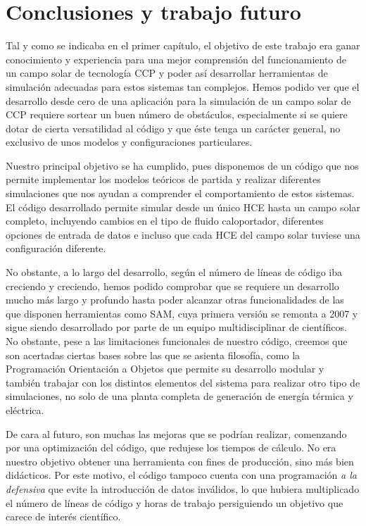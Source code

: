 \chapter{Conclusiones y trabajo futuro}
\label{conclusiones}

Tal y como se indicaba en el primer capítulo, el objetivo de este trabajo era ganar conocimiento y experiencia para una mejor comprensión del funcionamiento de un campo solar de tecnología CCP y poder así desarrollar herramientas de simulación adecuadas para estos sistemas tan complejos.  Hemos podido ver que el desarrollo desde cero de una aplicación para la simulación de un campo solar de CCP requiere sortear un buen número de obstáculos, especialmente si se quiere dotar de cierta versatilidad al código y que éste tenga un carácter general, no exclusivo de unos modelos y configuraciones particulares.

Nuestro principal objetivo se ha cumplido, pues disponemos de un código que nos permite implementar los modelos teóricos de partida y realizar diferentes simulaciones que nos ayudan a comprender el comportamiento de estos sistemas. El código desarrollado permite simular desde un único HCE hasta un campo solar completo, incluyendo cambios en el tipo de fluido caloportador, diferentes opciones de entrada de datos e incluso que cada HCE del campo solar tuviese una configuración diferente.

No obstante, a lo largo del desarrollo, según el número de líneas de código iba creciendo y creciendo, hemos podido comprobar que se requiere un desarrollo mucho más largo y profundo hasta poder alcanzar otras funcionalidades de las que disponen herramientas como SAM, cuya primera versión se remonta a 2007 y sigue siendo desarrollado por parte de un equipo multidisciplinar de científicos. No obstante, pese a las limitaciones funcionales de nuestro código, creemos que son acertadas ciertas bases sobre las que se asienta filosofía, como la Programación Orientación a Objetos que permite su desarrollo modular y también trabajar con los distintos elementos del sistema para realizar otro tipo de simulaciones, no solo de una planta completa de generación de energía térmica y eléctrica.

De cara al futuro, son muchas las mejoras que se podrían realizar, comenzando por una optimización del código, que redujese los tiempos de cálculo. No era nuestro objetivo obtener una herramienta con fines de producción, sino más bien didácticos. Por este motivo, el código tampoco cuenta con una programación \emph{a la defensiva} que evite la introducción de datos inválidos, lo que hubiera multiplicado el número de líneas de código y horas de trabajo persiguiendo un objetivo que carece de interés científico.

